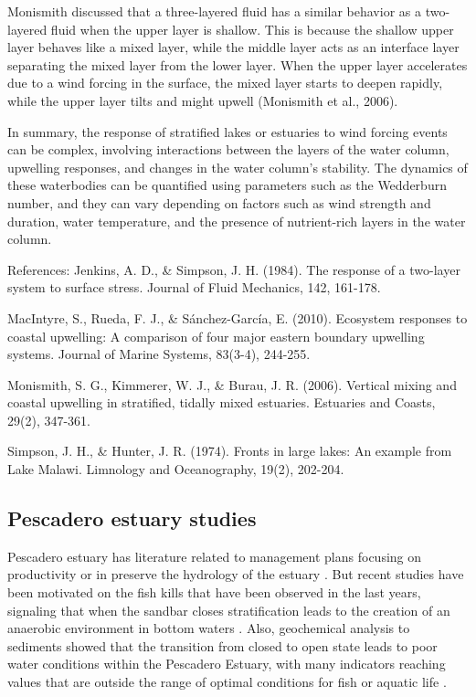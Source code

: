 \documentclass[tesis.tex]{subfiles}
\begin{document}
Monismith discussed that a three-layered fluid has a similar behavior as a two-layered fluid when the upper layer is shallow. This is because the shallow upper layer behaves like a mixed layer, while the middle layer acts as an interface layer separating the mixed layer from the lower layer. When the upper layer accelerates due to a wind forcing in the surface, the mixed layer starts to deepen rapidly, while the upper layer tilts and might upwell (Monismith et al., 2006).

In summary, the response of stratified lakes or estuaries to wind forcing events can be complex, involving interactions between the layers of the water column, upwelling responses, and changes in the water column's stability. The dynamics of these waterbodies can be quantified using parameters such as the Wedderburn number, and they can vary depending on factors such as wind strength and duration, water temperature, and the presence of nutrient-rich layers in the water column.

References:
Jenkins, A. D., & Simpson, J. H. (1984). The response of a two-layer system to surface stress. Journal of Fluid Mechanics, 142, 161-178.

MacIntyre, S., Rueda, F. J., & Sánchez-García, E. (2010). Ecosystem responses to coastal upwelling: A comparison of four major eastern boundary upwelling systems. Journal of Marine Systems, 83(3-4), 244-255.

Monismith, S. G., Kimmerer, W. J., & Burau, J. R. (2006). Vertical mixing and coastal upwelling in stratified, tidally mixed estuaries. Estuaries and Coasts, 29(2), 347-361.

Simpson, J. H., & Hunter, J. R. (1974). Fronts in large lakes: An example from Lake Malawi. Limnology and Oceanography, 19(2), 202-204.

\subsection{Pescadero estuary studies}

Pescadero estuary has literature related to management plans focusing on productivity \citep{curry1985pescadero} or in preserve the hydrology of the estuary \citep{williams1990pescadero}. But recent studies have been motivated on the fish kills that have been observed in the last years, signaling that when the sandbar closes stratification leads to the creation of an anaerobic environment in bottom waters \citep{sloan2006ecological}. Also, geochemical analysis to sediments showed that the transition from closed to open state leads to poor water conditions within the Pescadero Estuary, with many indicators reaching values that are outside the range of optimal conditions for fish or aquatic life \citep{richards2018}. \\
\end{document}
